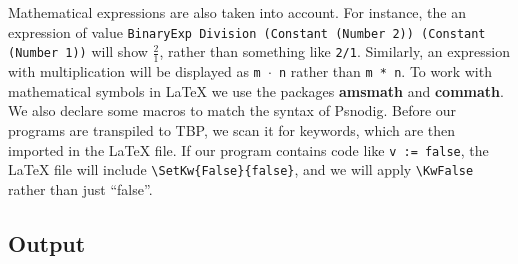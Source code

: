 Mathematical expressions are also taken into account. For instance, the an expression of value \texttt{BinaryExp Division (Constant (Number 2)) (Constant (Number 1))} will show $\frac{2}{1}$, rather than something like \texttt{2/1}. Similarly, an expression with multiplication will be displayed as \texttt{m $\cdot$ n} rather than \texttt{m * n}. To work with mathematical symbols in LaTeX we use the packages \textbf{amsmath} and \textbf{commath}. \hfill \\

We also declare some macros to match the syntax of Psnodig. Before our programs are transpiled to TBP, we scan it for keywords, which are then imported in the LaTeX file. If our program contains code like \texttt{v := false}, the LaTeX file will include \texttt{\textbackslash SetKw\{False\}\{false\}}, and we will apply \texttt{\textbackslash KwFalse} rather than just ``false''.

\subsection{Output}

